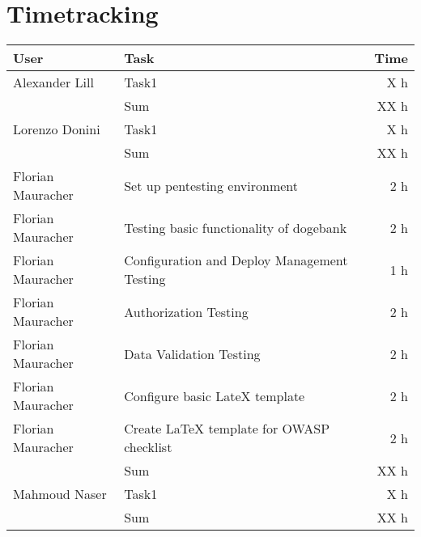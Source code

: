 \chapter{Timetracking}\label{chapter:timetracking}

\begin{table}[htpb]
  \centering
  \begin{tabularx}{\textwidth}{l X r}
    \toprule
      User & Task & Time \\
    \midrule
      Alexander Lill & Task1 & X h \\
      & Sum & XX h \\
    \midrule
      Lorenzo Donini & Task1 & X h \\
      & Sum & XX h \\
    \midrule
      Florian Mauracher & Set up pentesting environment & 2 h \\
      Florian Mauracher & Testing basic functionality of dogebank & 2 h \\
      Florian Mauracher & Configuration and Deploy Management Testing & 1 h \\
      Florian Mauracher & Authorization Testing & 2 h \\
      Florian Mauracher & Data Validation Testing & 2 h \\
      Florian Mauracher & Configure basic LateX template & 2 h \\
      Florian Mauracher & Create LaTeX template for OWASP checklist & 2 h \\
      & Sum & XX h \\
    \midrule
      Mahmoud Naser & Task1 & X h \\
      & Sum & XX h \\
    \bottomrule
  \end{tabularx}
\end{table}
